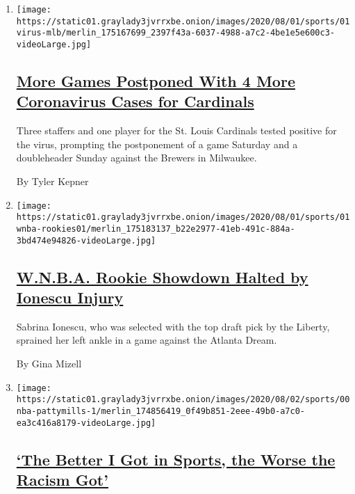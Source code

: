 \begin{enumerate}
\def\labelenumi{\arabic{enumi}.}
\item
  \texttt{[image: https://static01.graylady3jvrrxbe.onion/images/2020/08/01/sports/01virus-mlb/merlin\_175167699\_2397f43a-6037-4988-a7c2-4be1e5e600c3-videoLarge.jpg]}

  \hypertarget{more-games-postponed-with-4-more-coronavirus-cases-for-cardinals}{%
  \subsection{\texorpdfstring{\href{/2020/08/01/sports/baseball/coronavirus-cardinals.html}{More
  Games Postponed With 4 More Coronavirus Cases for
  Cardinals}}{More Games Postponed With 4 More Coronavirus Cases for Cardinals}}\label{more-games-postponed-with-4-more-coronavirus-cases-for-cardinals}}

  Three staffers and one player for the St. Louis Cardinals tested
  positive for the virus, prompting the postponement of a game Saturday
  and a doubleheader Sunday against the Brewers in Milwaukee.

  By Tyler Kepner
\item
  \texttt{[image: https://static01.graylady3jvrrxbe.onion/images/2020/08/01/sports/01wnba-rookies01/merlin\_175183137\_b22e2977-41eb-491c-884a-3bd474e94826-videoLarge.jpg]}

  \hypertarget{wnba-rookie-showdown-halted-by-ionescu-injury}{%
  \subsection{\texorpdfstring{\href{/2020/08/01/sports/basketball/sabrina-ionescu-injury.html}{W.N.B.A.
  Rookie Showdown Halted by Ionescu
  Injury}}{W.N.B.A. Rookie Showdown Halted by Ionescu Injury}}\label{wnba-rookie-showdown-halted-by-ionescu-injury}}

  Sabrina Ionescu, who was selected with the top draft pick by the
  Liberty, sprained her left ankle in a game against the Atlanta Dream.

  By Gina Mizell
\item
  \texttt{[image: https://static01.graylady3jvrrxbe.onion/images/2020/08/02/sports/00nba-pattymills-1/merlin\_174856419\_0f49b851-2eee-49b0-a7c0-ea3c416a8179-videoLarge.jpg]}

  \hypertarget{the-better-i-got-in-sports-the-worse-the-racism-got}{%
  \subsection{\texorpdfstring{\href{/2020/07/31/sports/basketball/spurs-patty-mills.html}{`The
  Better I Got in Sports, the Worse the Racism
  Got'}}{`The Better I Got in Sports, the Worse the Racism Got'}}\label{the-better-i-got-in-sports-the-worse-the-racism-got}}


\end{enumerate}
